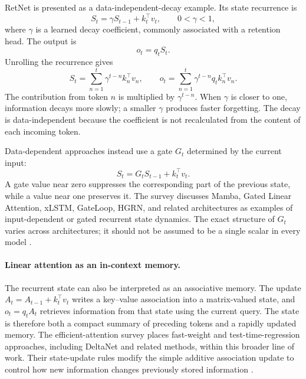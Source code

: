 RetNet is presented as a data-independent-decay example. Its state
recurrence is
\begin{equation}
    S_t=\gamma S_{t-1}+k_t^\top v_t,
    \qquad
    0<\gamma<1,
    \label{eq:attn-retnet-recurrence}
\end{equation}
where \(\gamma\) is a learned decay coefficient, commonly associated
with a retention head. The output is
\begin{equation}
    o_t=q_tS_t.
    \label{eq:attn-retnet-output}
\end{equation}
Unrolling the recurrence gives
\begin{equation}
    S_t
    =
    \sum_{n=1}^{t}
    \gamma^{t-n}k_n^\top v_n,
    \qquad
    o_t
    =
    \sum_{n=1}^{t}
    \gamma^{t-n}q_tk_n^\top v_n.
    \label{eq:attn-retnet-unrolled}
\end{equation}
The contribution from token \(n\) is multiplied by
\(\gamma^{t-n}\). When \(\gamma\) is closer to one, information decays
more slowly; a smaller \(\gamma\) produces faster forgetting. The decay
is data-independent because the coefficient is not recalculated from
the content of each incoming token.

Data-dependent approaches instead use a gate \(G_t\) determined by the
current input:
\begin{equation}
    S_t=G_tS_{t-1}+k_t^\top v_t.
    \label{eq:attn-data-dependent-gate}
\end{equation}
A gate value near zero suppresses the corresponding part of the previous
state, while a value near one preserves it. The survey discusses Mamba,
Gated Linear Attention, xLSTM, GateLoop, HGRN, and related architectures
as examples of input-dependent or gated recurrent state dynamics.
The exact structure of \(G_t\) varies across architectures; it should
not be assumed to be a single scalar in every model
\parencite{sun2026efficientattention}.

\paragraph{Linear attention as an in-context memory.}
The recurrent state can also be interpreted as an associative memory.
The update \(A_t=A_{t-1}+k_t^\top v_t\) writes a key--value association
into a matrix-valued state, and \(o_t=q_tA_t\) retrieves information
from that state using the current query. The state is therefore both
a compact summary of preceding tokens and a rapidly updated memory.
The efficient-attention survey places fast-weight and test-time-regression
approaches, including DeltaNet and related methods, within this broader
line of work. Their state-update rules modify the simple additive
association update to control how new information changes previously
stored information \parencite{sun2026efficientattention}.

